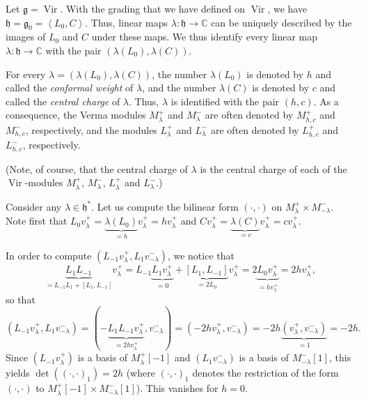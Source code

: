 \documentclass[etingof-lie.tex]{subfiles}
\begin{document}
\begin{example}
\label{exa.Vir}Let $\mathfrak{g}=\operatorname*{Vir}$. With the grading that
we have defined on $\operatorname*{Vir}$, we have $\mathfrak{h}=\mathfrak{g}%
_{0}=\left\langle L_{0},C\right\rangle $. Thus, linear maps $\lambda
:\mathfrak{h}\rightarrow\mathbb{C}$ can be uniquely described by the images of
$L_{0}$ and $C$ under these maps. We thus identify every linear map
$\lambda:\mathfrak{h}\rightarrow\mathbb{C}$ with the pair $\left(
\lambda\left(  L_{0}\right)  ,\lambda\left(  C\right)  \right)  $.

For every $\lambda=\left(  \lambda\left(  L_{0}\right)  ,\lambda\left(
C\right)  \right)  $, the number $\lambda\left(  L_{0}\right)  $ is denoted by
$h$ and called the \textit{conformal weight} of $\lambda$, and the number
$\lambda\left(  C\right)  $ is denoted by $c$ and called the \textit{central
charge} of $\lambda$. Thus, $\lambda$ is identified with the pair $\left(
h,c\right)  $. As a consequence, the Verma modules $M_{\lambda}^{+}$ and
$M_{\lambda}^{-}$ are often denoted by $M_{h,c}^{+}$ and $M_{h,c}^{-}$,
respectively, and the modules $L_{\lambda}^{+}$ and $L_{\lambda}^{-}$ are
often denoted by $L_{h,c}^{+}$ and $L_{h,c}^{-}$, respectively.

(Note, of course, that the central charge of $\lambda$ is the central charge
of each of the $\operatorname*{Vir}$-modules $M_{\lambda}^{+}$, $M_{\lambda
}^{-}$, $L_{\lambda}^{+}$ and $L_{\lambda}^{-}$.)

Consider any $\lambda\in\mathfrak{h}^{\ast}$. Let us compute the bilinear form
$\left(  \cdot,\cdot\right)  $ on $M_{\lambda}^{+}\times M_{-\lambda}^{-}$.
Note first that $L_{0}v_{\lambda}^{+}=\underbrace{\lambda\left(  L_{0}\right)
}_{=h}v_{\lambda}^{+}=hv_{\lambda}^{+}$ and $Cv_{\lambda}^{+}%
=\underbrace{\lambda\left(  C\right)  }_{=c}v_{\lambda}^{+}=cv_{\lambda}^{+}$.

In order to compute $\left(  L_{-1}v_{\lambda}^{+},L_{1}v_{-\lambda}%
^{-}\right)  $, we notice that
\[
\underbrace{L_{1}L_{-1}}_{=L_{-1}L_{1}+\left[  L_{1},L_{-1}\right]
}v_{\lambda}^{+}=L_{-1}\underbrace{L_{1}v_{\lambda}^{+}}_{=0}%
+\underbrace{\left[  L_{1},L_{-1}\right]  }_{=2L_{0}}v_{\lambda}%
^{+}=2\underbrace{L_{0}v_{\lambda}^{+}}_{=hv_{\lambda}^{+}}=2hv_{\lambda}%
^{+},
\]
so that%
\[
\left(  L_{-1}v_{\lambda}^{+},L_{1}v_{-\lambda}^{-}\right)  =\left(
-\underbrace{L_{1}L_{-1}v_{\lambda}^{+}}_{=2hv_{\lambda}^{+}},v_{-\lambda}%
^{-}\right)  =\left(  -2hv_{\lambda}^{+},v_{-\lambda}^{-}\right)
=-2h\underbrace{\left(  v_{\lambda}^{+},v_{-\lambda}^{-}\right)  }_{=1}=-2h.
\]
Since $\left(  L_{-1}v_{\lambda}^{+}\right)  $ is a basis of $M_{\lambda}%
^{+}\left[  -1\right]  $ and $\left(  L_{1}v_{-\lambda}^{-}\right)  $ is a
basis of $M_{-\lambda}^{-}\left[  1\right]  $, this yields $\det\left(
\left(  \cdot,\cdot\right)  _{1}\right)  =2h$ (where $\left(  \cdot
,\cdot\right)  _{1}$ denotes the restriction of the form $\left(  \cdot
,\cdot\right)  $ to $M_{\lambda}^{+}\left[  -1\right]  \times M_{-\lambda}%
^{-}\left[  1\right]  $). This vanishes for $h=0$.


\end{example}
\end{document}
